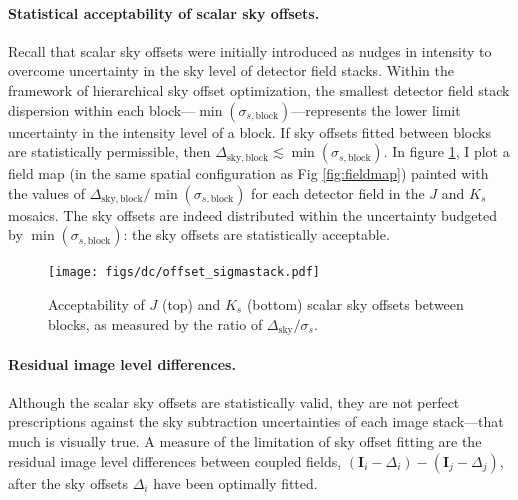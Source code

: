 \documentclass[iop]{emulateapj}
\newcommand{\vect}[1]{\boldsymbol{#1}} %
\begin{document}
\paragraph{Statistical acceptability of scalar sky offsets.} Recall that scalar sky offsets were initially introduced as nudges in intensity to overcome uncertainty in the sky level of detector field stacks. Within the framework of hierarchical sky offset optimization, the smallest detector field stack dispersion within each block---$\min(\sigma_{s,\mathrm{block}})$---represents the lower limit uncertainty in the intensity level of a block. If sky offsets fitted between blocks are statistically permissible, then $\Delta_\mathrm{sky,block} \lesssim \min (\sigma_{s,\mathrm{block}})$. In figure \ref{fig:offset_sigmastack}, I plot a field map (in the same spatial configuration as Fig \ref{fig:fieldmap}) painted with the values of $\Delta_\mathrm{sky,block} / \min (\sigma_{s,\mathrm{block}})$ for each detector field in the $J$ and $K_s$ mosaics. The sky offsets are indeed distributed within the uncertainty budgeted by $\min (\sigma_{s,\mathrm{block}})$: the sky offsets are statistically acceptable.

% 

\begin{figure}[t]
    \centering
        \texttt{[image: figs/dc/offset\_sigmastack.pdf]}
    \caption[Acceptability of $J$ and $K_s$ scalar sky offsets between blocks, as measured by the ratio of $\Delta_\mathrm{sky}/\sigma_s$]{Acceptability of $J$ (top) and $K_s$ (bottom) scalar sky offsets between blocks, as measured by the ratio of $\Delta_\mathrm{sky}/\sigma_s$.}
    \label{fig:offset_sigmastack}
\end{figure}


\paragraph{Residual image level differences.} Although the scalar sky offsets are statistically valid, they are not perfect prescriptions against the sky subtraction uncertainties of each image stack---that much is visually true. A measure of the limitation of sky offset fitting are the residual image level differences between coupled fields, $(\vect{I}_i - \Delta_i) - (\vect{I}_j - \Delta_j)$, after the sky offsets $\Delta_i$ have been optimally fitted.
\end{document}
